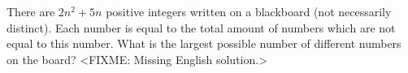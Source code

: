 \problem
There are $2 n^2 + 5 n$ positive integers written on a blackboard
(not necessarily distinct).
Each number is equal to the total amount of numbers which are not equal to this
number.
What is the largest possible number of different numbers on the board?
\solution
<FIXME: Missing English solution.>
\endproblem
